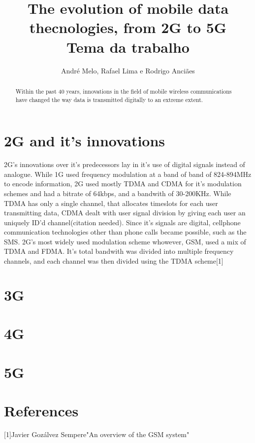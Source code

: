 \documentclass{article}
\title{The evolution of mobile data thecnologies, from 2G to 5G\\
	\large Tema da trabalho \\}
\author{André Melo, Rafael Lima e Rodrigo Anciães}
\begin{document}
\maketitle
\begin{abstract}
Within the past 40 years, innovations in the field of mobile wireless communications have changed the way data is transmitted digitally to an extreme extent.   
\end{abstract}
\pagebreak

\section{2G and it's innovations}
2G's innovations over it's predecessors lay in it's use of digital signals instead of analogue. While 1G used frequency modulation at a band of band of 824-894MHz to encode information, 2G used mostly TDMA and CDMA for it's modulation schemes and had a bitrate of 64kbps, and a bandwith of 30-200KHz. While TDMA has only a single channel, that allocates timeslots for each user transmitting data, CDMA dealt with user signal division by giving each user an uniquely ID'd channel(citation needed). Since it's signals are digital, cellphone communication technologies other than phone calls became possible, such as the SMS. 2G's most widely used modulation scheme whowever, GSM, used a mix of TDMA and FDMA. It's total bandwith was divided into multiple frequency channels, and each channel was then divided using the TDMA scheme[1]

\section{3G}

\section{4G}

\section{5G}

\section{References}
[1]Javier Gozálvez Sempere"An overview of the GSM system"
\end{document}
